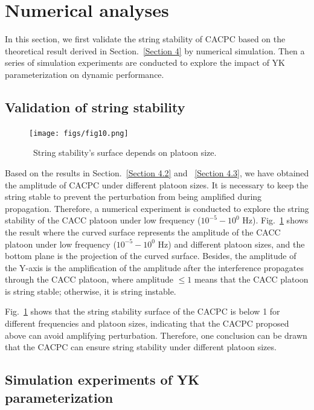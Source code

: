 \documentclass[journal]{IEEEtran}
\begin{document}
\section{Numerical analyses}
\label{Section 5}

In this section, we first validate the string stability of CACPC based on the theoretical result derived in Section.~\ref{Section 4} by numerical simulation. Then a series of simulation experiments are conducted to explore the impact of YK parameterization on dynamic performance.

\subsection{Validation of string stability}
\label{Section 5.1}

\begin{figure}
  \centering
  \texttt{[image: figs/fig10.png]}
  \caption{~String stability's surface depends on platoon size.}
  \label{fig10}
\end{figure}

Based on the results in Section.~\ref{Section 4.2} and ~\ref{Section 4.3}, we have obtained the amplitude of CACPC under different platoon sizes. It is necessary to keep the string stable to prevent the perturbation from being amplified during propagation. Therefore, a numerical experiment is conducted to explore the string stability of the CACC platoon under low frequency ($10^{-5} - 10^0$ Hz). Fig.~\ref{fig10} shows the result where the curved surface represents the amplitude of the CACC platoon under low frequency ($10^{-5} - 10^0$ Hz) and different platoon sizes, and the bottom plane is the projection of the curved surface. Besides, the amplitude of the Y-axis is the amplification of the amplitude after the interference propagates through the CACC platoon, where amplitude $\le 1$ means that the CACC platoon is string stable; otherwise, it is string instable.

Fig.~\ref{fig10} shows that the string stability surface of the CACPC is below 1 for different frequencies and platoon sizes, indicating that the CACPC proposed above can avoid amplifying perturbation. Therefore, one conclusion can be drawn that the CACPC can ensure string stability under different platoon sizes.

\subsection{Simulation experiments of YK parameterization}
\label{Section 5.2}
\end{document}
